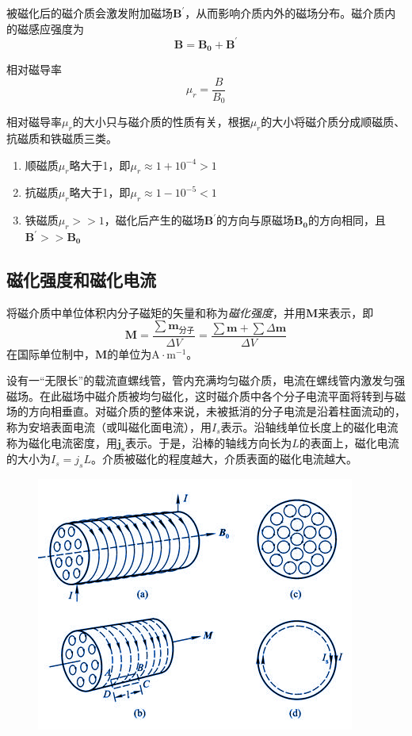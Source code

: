 \documentclass[
	12pt, %
	a4paper, %
]{myLegrandOrangeBook}
\begin{document}
被磁化后的磁介质会激发附加磁场\(\boldsymbol{B^\prime}\)，从而影响介质内外的磁场分布。磁介质内的磁感应强度为
\begin{equation}
    \boldsymbol{B} = \boldsymbol{B_0} + \boldsymbol{B^ \prime}
\end{equation}

相对磁导率
\begin{equation}
    \mu_r = \frac{B}{B_0}
\end{equation}

相对磁导率\(\mu_r\)的大小只与磁介质的性质有关，根据\(\mu_r\)的大小将磁介质分成顺磁质、抗磁质和铁磁质三类。

\begin{enumerate}
    \item 顺磁质\(\mu_r\)略大于1，即\(\mu_r \approx 1 + 10^{-4} > 1\)
    \item 抗磁质\(\mu_r\)略大于1，即\(\mu_r \approx 1 - 10^{-5} < 1\)
    \item 铁磁质\(\mu_r >> 1\)，磁化后产生的磁场\(\boldsymbol{B^\prime}\)的方向与原磁场\(\boldsymbol{B_0}\)的方向相同，且\(\boldsymbol{B^\prime} >> \boldsymbol{B_0}\)
\end{enumerate}

\subsection{磁化强度和磁化电流}

将磁介质中单位体积内分子磁矩的矢量和称为\emph{磁化强度}，并用\(\boldsymbol{M}\)来表示，即
\begin{equation}
    \boldsymbol{M} = \frac{\sum \boldsymbol{m_{\text{分子}}}}{\Delta V} = \frac{\sum \boldsymbol{m} + \sum \Delta \boldsymbol{m}}{\Delta V}
\end{equation}
在国际单位制中，\(\boldsymbol{M}\)的单位为\(\mathrm{A} \cdot \mathrm{m}^{-1}\)。

设有一“无限长”的载流直螺线管，管内充满均匀磁介质，电流在螺线管内激发匀强磁场。在此磁场中磁介质被均匀磁化，这时磁介质中各个分子电流平面将转到与磁场的方向相垂直。对磁介质的整体来说，未被抵消的分子电流是沿着柱面流动的，称为安培表面电流（或叫磁化面电流），用\(I_s\)表示。沿轴线单位长度上的磁化电流称为磁化电流密度，用\(\boldsymbol{j_s}\)表示。于是，沿棒的轴线方向长为\(L\)的表面上，磁化电流的大小为\(I_s = j_s L\)。介质被磁化的程度越大，介质表面的磁化电流越大。

\begin{figure}[!h]
    \centering
    \includegraphics[width = .4\textwidth]{graphics/磁化电流.png}
\end{figure}
\end{document}
